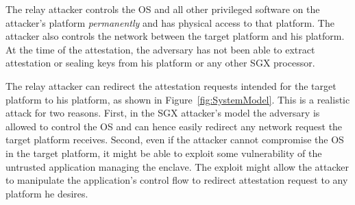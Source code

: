 The relay attacker controls the OS and all other privileged software on the attacker's platform \emph{permanently} and has physical access to that platform. The attacker also controls the network between the target platform and his platform. At the time of the attestation, the adversary has not been able to extract attestation or sealing keys from his platform or any other SGX processor.

 The relay attacker can redirect the attestation requests intended for the target platform to his platform, as shown in Figure~\ref{fig:SystemModel}. This is a realistic attack for two reasons. First, in the SGX attacker's model the adversary is allowed to control the OS and can hence easily redirect any network request the target platform receives. Second, even if the attacker cannot compromise the OS in the target platform, it might be able to exploit some vulnerability of the untrusted application managing the enclave. The exploit might allow the attacker to manipulate the application's control flow to redirect attestation request to any platform he desires.


